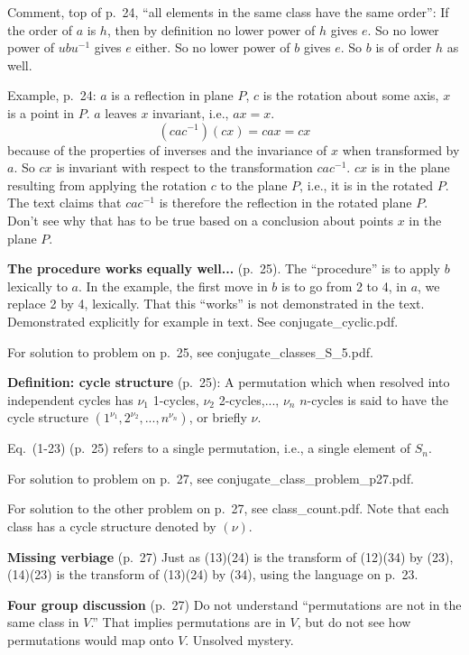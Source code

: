 Comment, top of p.\ 24, ``all elements in the same class have the same
order'': If the order of $a$ is $h$, then by definition no lower power
of $h$ gives $e$. So no lower power of $ubu^{-1}$ gives $e$ either. So
no lower power of $b$ gives $e$. So $b$ is of order $h$ as well.

Example, p.\ 24: $a$ is a reflection in plane $P$, $c$ is the rotation
about some axis, $x$ is a point in $P$. $a$ leaves $x$ invariant,
i.e., $ax = x$.
$$
(cac^{-1})(cx) = cax = cx
$$ because of the properties of inverses and the invariance of $x$
when transformed by $a$. So $cx$ is invariant with respect to the
transformation $cac^{-1}$. $cx$ is in the plane resulting from
applying the rotation $c$ to the plane $P$, i.e., it is in the rotated
$P$. The text claims that $cac^{-1}$ is therefore the reflection in
the rotated plane $P$. Don't see why that has to be true based on a
conclusion about points $x$ in the plane $P$.

{\bf The procedure works equally well...} (p.\ 25). The ``procedure''
is to apply $b$ lexically to $a$. In the example, the first move in $b$
is to go from 2 to 4, in $a$, we replace 2 by 4, lexically. That this
``works'' is not demonstrated in the text. Demonstrated explicitly
for example in text. See conjugate\_cyclic.pdf.

For solution to problem on p.\ 25, see conjugate\_classes\_S\_5.pdf.

{\bf Definition: cycle structure} (p.\ 25): A permutation which when
resolved into independent cycles has $\nu_1$ 1-cycles, $\nu_2$
2-cycles,..., $\nu_n$ $n$-cycles is said to have the cycle structure
$(1^{\nu_1},2^{\nu_2},...,n^{\nu_n})$, or briefly $\nu$.

Eq.\ (1-23) (p.\ 25) refers to a single permutation, i.e., a single element of $S_n$.

For solution to problem on p.\ 27, see conjugate\_class\_problem\_p27.pdf.

For solution to the other problem on p.\ 27, see class\_count.pdf. Note
that each class has a cycle structure denoted by $(\nu)$.

{\bf Missing verbiage} (p.\ 27) Just as (13)(24) is the transform of
(12)(34) by (23), (14)(23) is the transform of (13)(24) by (34), using
the language on p.\ 23.

{\bf Four group discussion} (p.\ 27) Do not understand ``permutations
are not in the same class in $V$.'' That implies permutations are in
$V$, but do not see how permutations would map onto $V$. Unsolved
mystery.

